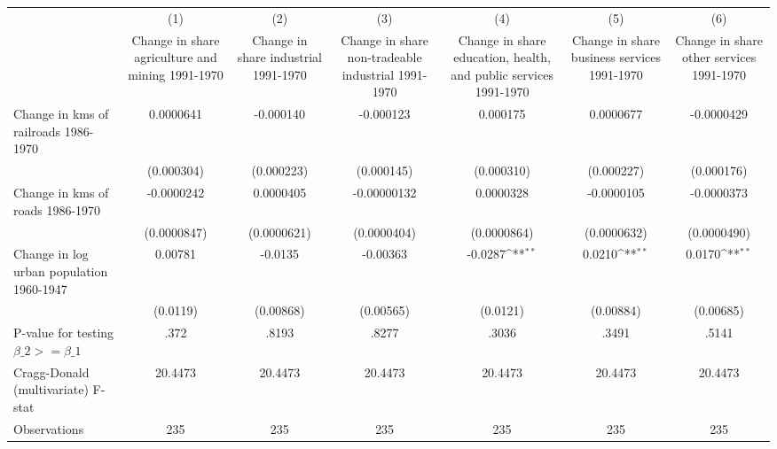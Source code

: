 {
\def\sym#1{\ifmmode^{#1}\else\(^{#1}\)\fi}
\begin{tabular}{l*{6}{c}}
\hline\hline
                &\multicolumn{1}{c}{(1)}&\multicolumn{1}{c}{(2)}&\multicolumn{1}{c}{(3)}&\multicolumn{1}{c}{(4)}&\multicolumn{1}{c}{(5)}&\multicolumn{1}{c}{(6)}\\
                &\multicolumn{1}{c}{Change in share agriculture and mining 1991-1970}&\multicolumn{1}{c}{Change in share industrial 1991-1970}&\multicolumn{1}{c}{Change in share non-tradeable industrial 1991-1970}&\multicolumn{1}{c}{Change in share education, health, and public services 1991-1970}&\multicolumn{1}{c}{Change in share business services 1991-1970}&\multicolumn{1}{c}{Change in share other services 1991-1970}\\
\hline
Change in kms of railroads 1986-1970&0.0000641         &-0.000140         &-0.000123         & 0.000175         &0.0000677         &-0.0000429         \\
                &(0.000304)         &(0.000223)         &(0.000145)         &(0.000310)         &(0.000227)         &(0.000176)         \\
[1em]
Change in kms of roads 1986-1970&-0.0000242         &0.0000405         &-0.00000132         &0.0000328         &-0.0000105         &-0.0000373         \\
                &(0.0000847)         &(0.0000621)         &(0.0000404)         &(0.0000864)         &(0.0000632)         &(0.0000490)         \\
[1em]
Change in log urban population 1960-1947&  0.00781         &  -0.0135         & -0.00363         &  -0.0287\sym{**} &   0.0210\sym{**} &   0.0170\sym{**} \\
                & (0.0119)         &(0.00868)         &(0.00565)         & (0.0121)         &(0.00884)         &(0.00685)         \\
\hline
P-value for testing $\beta\_{2} >= \beta\_{1}$&     .372         &    .8193         &    .8277         &    .3036         &    .3491         &    .5141         \\
Cragg-Donald (multivariate) F-stat&  20.4473         &  20.4473         &  20.4473         &  20.4473         &  20.4473         &  20.4473         \\
Observations    &      235         &      235         &      235         &      235         &      235         &      235         \\
\hline\hline
\end{tabular}
}
